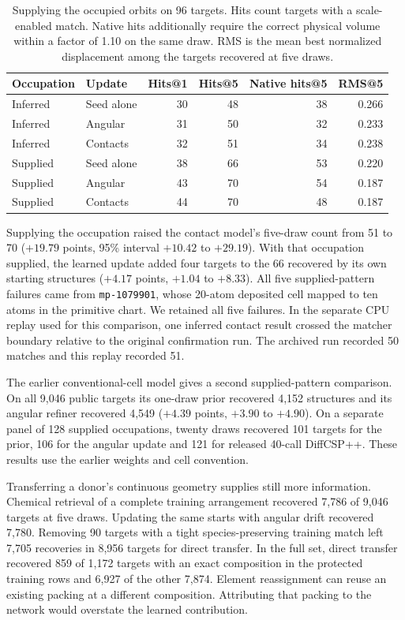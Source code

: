 \begin{table}[tbp]\centering\small
\caption{Supplying the occupied orbits on 96 targets. Hits count targets with a scale-enabled match. Native hits additionally require the correct physical volume within a factor of 1.10 on the same draw. RMS is the mean best normalized displacement among the targets recovered at five draws.}
\label{tab:gen-supplied}
\begin{tabular}{llrrrr}\hline
Occupation & Update & Hits@1 & Hits@5 & Native hits@5 & RMS@5\\\hline
Inferred & Seed alone & 30 & 48 & 38 & 0.266\\
Inferred & Angular & 31 & 50 & 32 & 0.233\\
Inferred & Contacts & 32 & 51 & 34 & 0.238\\
Supplied & Seed alone & 38 & 66 & 53 & 0.220\\
Supplied & Angular & 43 & 70 & 54 & 0.187\\
Supplied & Contacts & 44 & 70 & 48 & 0.187\\\hline
\end{tabular}
\end{table}

Supplying the occupation raised the contact model's five-draw count from 51 to 70 ($+19.79$ points, 95\% interval $+10.42$ to $+29.19$). With that occupation supplied, the learned update added four targets to the 66 recovered by its own starting structures ($+4.17$ points, $+1.04$ to $+8.33$). All five supplied-pattern failures came from \texttt{mp-1079901}, whose 20-atom deposited cell mapped to ten atoms in the primitive chart. We retained all five failures. In the separate CPU replay used for this comparison, one inferred contact result crossed the matcher boundary relative to the original confirmation run. The archived run recorded 50 matches and this replay recorded 51.

The earlier conventional-cell model gives a second supplied-pattern comparison. On all 9,046 public targets its one-draw prior recovered 4,152 structures and its angular refiner recovered 4,549 ($+4.39$ points, $+3.90$ to $+4.90$). On a separate panel of 128 supplied occupations, twenty draws recovered 101 targets for the prior, 106 for the angular update and 121 for released 40-call DiffCSP++. These results use the earlier weights and cell convention.

Transferring a donor's continuous geometry supplies still more information. Chemical retrieval of a complete training arrangement recovered 7,786 of 9,046 targets at five draws. Updating the same starts with angular drift recovered 7,780. Removing 90 targets with a tight species-preserving training match left 7,705 recoveries in 8,956 targets for direct transfer. In the full set, direct transfer recovered 859 of 1,172 targets with an exact composition in the protected training rows and 6,927 of the other 7,874. Element reassignment can reuse an existing packing at a different composition. Attributing that packing to the network would overstate the learned contribution.

